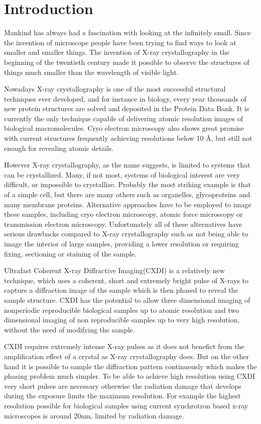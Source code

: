 \chapter{Introduction}\label{introduction}\noindent

Mankind has always had a fascination with looking at the infinitely
small. Since the invention of microscope people have been trying to find ways to
look at smaller and smaller things. The invention of X-ray crystallography in
the beginning of the twentieth century made it possible to observe the
structures of things much smaller than the wavelength of visible light.

Nowadays X-ray crystallography is one of the most successful structural techniques ever
developed, and for instance in biology, every year thousands of new protein structures are solved and deposited
in the Protein Data Bank. It is currently the only technique capable of
delivering atomic resolution images of biological macromolecules. Cryo electron microscopy also shows great promise with current
structures frequently achieving resolutions below 10 \AA, but still not enough
for revealing atomic details.

However X-ray crystallography, as the name suggests, is limited to systems that
can be crystallized. Many, if not most, systems of biological interest are very
difficult, or impossible to crystallize. Probably the most striking example is
that of a simple cell, but there are many others such as organelles, glycoproteins and many
membrane proteins. Alternative approaches have to be employed to image these
samples, including cryo electron microscopy, atomic force microscopy or
transmission electron microscopy. Unfortunately all of these alternatives have
serious drawbacks compared to X-ray crystallography such as not being able to
image the interior of large samples, providing a lower resolution or requiring
fixing, sectioning or staining of the sample.

Ultrafast Coherent X-ray Diffractive Imaging(CXDI) is a relatively new
technique, which uses a coherent, short and extremely
bright pulse of X-rays to capture a diffraction image of the sample which is
then phased to reveal the sample structure. CXDI has the potential to allow three
dimensional imaging of nonperiodic reproducible biological samples up to atomic
resolution and two dimensional imaging of non reproducible samples up to
very high resolution, without the need of modifying the sample.

CXDI requires extremely intense X-ray pulses as it does not benefict from the
amplification effect of a crystal as X-ray crystallography does. But on the
other hand it is possible to sample the diffraction pattern continuously which
makes the phasing problem much simpler. To be able to achieve high 
resolution using CXDI very short pulses are necessary otherwise the radiation
damage that develops during the exposure limits the maximum resolution. For
example the highest resolution possible for biological samples using current
synchrotron based x-ray microscopes is around 20nm, limited by radiation
damage. \cite{MalcomDamage}

